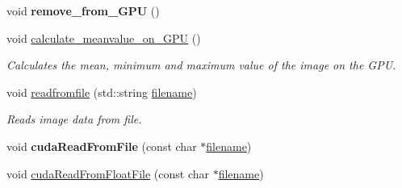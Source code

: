 \begin{DoxyCompactItemize}
\item 
void {\bfseries remove\+\_\+from\+\_\+\+G\+PU} ()\hypertarget{classImage__cuda__compatible_a23d156919fbb8021001049583a4f05bf}{}\label{classImage__cuda__compatible_a23d156919fbb8021001049583a4f05bf}

\item 
void \hyperlink{classImage__cuda__compatible_a249c0b2acafcf79d200a751d186c7159}{calculate\+\_\+meanvalue\+\_\+on\+\_\+\+G\+PU} ()\hypertarget{classImage__cuda__compatible_a249c0b2acafcf79d200a751d186c7159}{}\label{classImage__cuda__compatible_a249c0b2acafcf79d200a751d186c7159}

\begin{DoxyCompactList}\small\item\em Calculates the mean, minimum and maximum value of the image on the G\+PU. \end{DoxyCompactList}\item 
void \hyperlink{classImage__cuda__compatible_a1bc41929e895753fb94d12f3706ed448}{readfromfile} (std\+::string \hyperlink{classImage__cuda__compatible_a5dbc3fe00b4ca74f9a3868849cb24406}{filename})
\begin{DoxyCompactList}\small\item\em Reads image data from file. \end{DoxyCompactList}\item 
void {\bfseries cuda\+Read\+From\+File} (const char $\ast$\hyperlink{classImage__cuda__compatible_a5dbc3fe00b4ca74f9a3868849cb24406}{filename})\hypertarget{classImage__cuda__compatible_a2a22e3122b2f51934449d7024efaf1f2}{}\label{classImage__cuda__compatible_a2a22e3122b2f51934449d7024efaf1f2}

\item 
void \hyperlink{classImage__cuda__compatible_a4cab4c65aced6215d8ce7c5abfd39f47}{cuda\+Read\+From\+Float\+File} (const char $\ast$\hyperlink{classImage__cuda__compatible_a5dbc3fe00b4ca74f9a3868849cb24406}{filename})\hypertarget{classImage__cuda__compatible_a4cab4c65aced6215d8ce7c5abfd39f47}{}\label{classImage__cuda__compatible_a4cab4c65aced6215d8ce7c5abfd39f47}


\end{DoxyCompactItemize}
